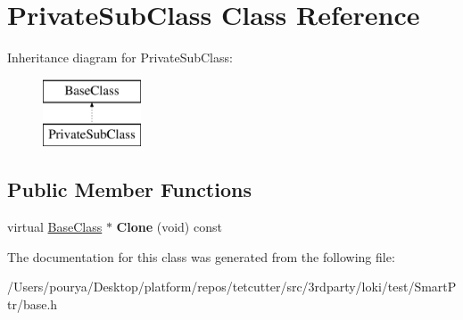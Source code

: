 \hypertarget{classPrivateSubClass}{}\section{Private\+Sub\+Class Class Reference}
\label{classPrivateSubClass}
Inheritance diagram for Private\+Sub\+Class\+:\begin{figure}[H]
\begin{center}
\leavevmode
\includegraphics[height=2.000000cm]{classPrivateSubClass}
\end{center}
\end{figure}
\subsection*{Public Member Functions}
\begin{DoxyCompactItemize}
\item 
\hypertarget{classPrivateSubClass_a9cd971a064178a2d5a08e1323bc92273}{}virtual \hyperlink{classBaseClass}{Base\+Class} $\ast$ {\bfseries Clone} (void) const \label{classPrivateSubClass_a9cd971a064178a2d5a08e1323bc92273}

\end{DoxyCompactItemize}


The documentation for this class was generated from the following file\+:\begin{DoxyCompactItemize}
\item 
/\+Users/pourya/\+Desktop/platform/repos/tetcutter/src/3rdparty/loki/test/\+Smart\+Ptr/base.\+h\end{DoxyCompactItemize}
